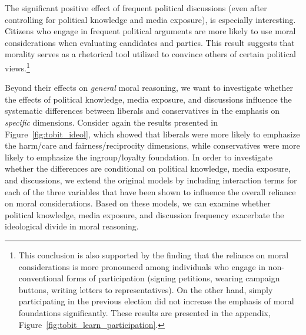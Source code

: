 \documentclass[12pt]{article}
\begin{document}
The significant positive effect of frequent political discussions (even after controlling for political knowledge and media exposure), is especially interesting. Citizens who engage in frequent political arguments are more likely to use moral considerations when evaluating candidates and parties. This result suggests that morality serves as a rhetorical tool utilized to convince others of certain political views.\footnote{This conclusion is also supported by the finding that the reliance on moral considerations is more pronounced among individuals who engage in non-conventional forms of participation (signing petitions, wearing campaign buttons, writing letters to representatives). On the other hand, simply participating in the previous election did not increase the emphasis of moral foundations significantly. These results are presented in the appendix, Figure~\ref{fig:tobit_learn_participation}.}

Beyond their effects on \textit{general} moral reasoning, we want to investigate whether the effects of political knowledge, media exposure, and discussions influence the systematic differences between liberals and conservatives in the emphasis on \textit{specific} dimensions. Consider again the results presented in Figure~\ref{fig:tobit_ideol}, which showed that liberals were more likely to emphasize the harm/care and fairness/reciprocity dimensions, while conservatives were more likely to emphasize the ingroup/loyalty foundation. In order to investigate whether the differences are conditional on political knowledge, media exposure, and discussions, we extend the original models by including interaction terms for each of the three variables that have been shown to influence the overall reliance on moral considerations. Based on these models, we can examine whether political knowledge, media exposure, and discussion frequency exacerbate the ideological divide in moral reasoning.
\end{document}

